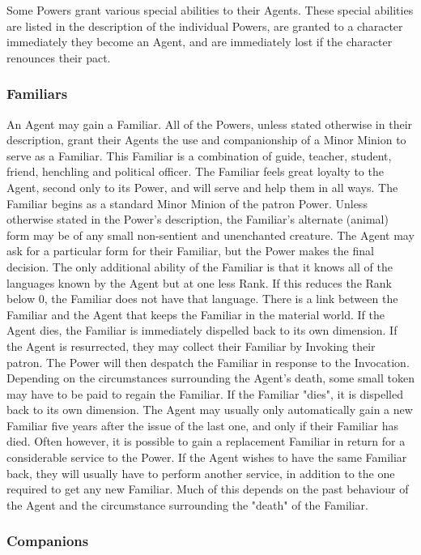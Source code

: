 Some Powers grant various special abilities to their Agents.  These
special abilities are listed in the description of the individual
Powers, are granted to a character immediately they become an Agent,
and are immediately lost if the character renounces their pact.

\subsubsection{Familiars}

An Agent may gain a Familiar.  All of the Powers, unless stated
otherwise in their description, grant their Agents the use and
companionship of a Minor Minion to serve as a Familiar.  This Familiar
is a combination of guide, teacher, student, friend, henchling and
political officer.  The Familiar feels great loyalty to the Agent,
second only to its Power, and will serve and help them in all ways.
The Familiar begins as a standard Minor Minion of the patron Power.
Unless otherwise stated in the Power's description, the Familiar's
alternate (animal) form may be of any small non-sentient and
unenchanted creature.  The Agent may ask for a particular form for
their Familiar, but the Power makes the final decision.  The only
additional ability of the Familiar is that it knows all of the
languages known by the Agent but at one less Rank.  If this reduces
the Rank below 0, the Familiar does not have that language.  There is
a link between the Familiar and the Agent that keeps the Familiar in
the material world.  If the Agent dies, the Familiar is immediately
dispelled back to its own dimension.  If the Agent is resurrected,
they may collect their Familiar by Invoking their patron.  The Power
will then despatch the Familiar in response to the Invocation.
Depending on the circumstances surrounding the Agent's death, some
small token may have to be paid to regain the Familiar.  If the
Familiar "dies", it is dispelled back to its own dimension.  The Agent
may usually only automatically gain a new Familiar five years after
the issue of the last one, and only if their Familiar has died. Often
however, it is possible to gain a replacement Familiar in return for a
considerable service to the Power.  If the Agent wishes to have the
same Familiar back, they will usually have to perform another service,
in addition to the one required to get any new Familiar.  Much of this
depends on the past behaviour of the Agent and the circumstance
surrounding the "death" of the Familiar.

\subsubsection{Companions}

